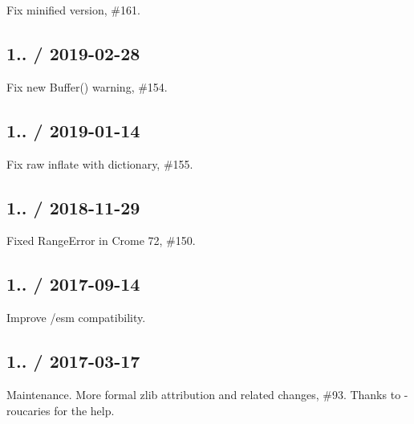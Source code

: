 
\begin{DoxyItemize}
\item Fix minified version, \#161.
\end{DoxyItemize}

\subsection*{1.. / 2019-\/02-\/28 }


\begin{DoxyItemize}
\item Fix {\ttfamily new Buffer()} warning, \#154.
\end{DoxyItemize}

\subsection*{1.. / 2019-\/01-\/14 }


\begin{DoxyItemize}
\item Fix raw inflate with dictionary, \#155.
\end{DoxyItemize}

\subsection*{1.. / 2018-\/11-\/29 }


\begin{DoxyItemize}
\item Fixed Range\+Error in Crome 72, \#150.
\end{DoxyItemize}

\subsection*{1.. / 2017-\/09-\/14 }


\begin{DoxyItemize}
\item Improve /esm compatibility.
\end{DoxyItemize}

\subsection*{1.. / 2017-\/03-\/17 }


\begin{DoxyItemize}
\item Maintenance. More formal {\ttfamily zlib} attribution and related changes, \#93. Thanks to -\/roucaries for the help.
\end{DoxyItemize}

